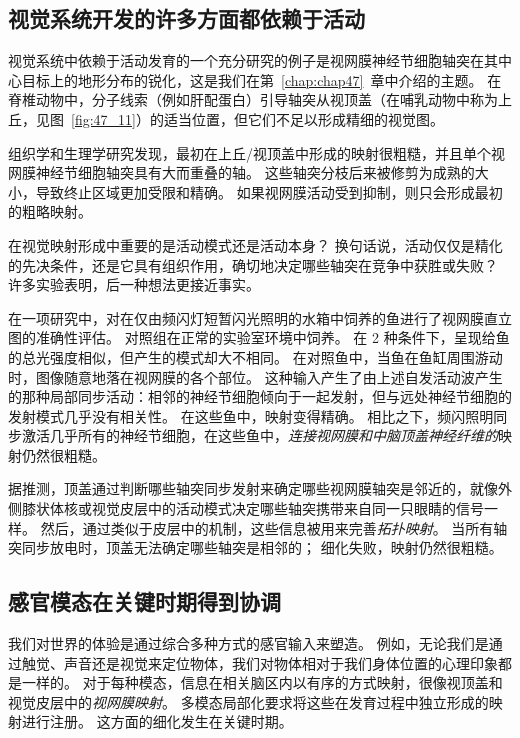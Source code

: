 \subsection{视觉系统开发的许多方面都依赖于活动}

视觉系统中依赖于活动发育的一个充分研究的例子是视网膜神经节细胞轴突在其中心目标上的地形分布的锐化，这是我们在第~\ref{chap:chap47}~章中介绍的主题。
在脊椎动物中，分子线索（例如肝配蛋白）引导轴突从视顶盖（在哺乳动物中称为上丘，见图~\ref{fig:47_11}）的适当位置，但它们不足以形成精细的视觉图。


组织学和生理学研究发现，最初在上丘/视顶盖中形成的映射很粗糙，并且单个视网膜神经节细胞轴突具有大而重叠的轴。
这些轴突分枝后来被修剪为成熟的大小，导致终止区域更加受限和精确。
如果视网膜活动受到抑制，则只会形成最初的粗略映射。


在视觉映射形成中重要的是活动模式还是活动本身？
换句话说，活动仅仅是精化的先决条件，还是它具有组织作用，确切地决定哪些轴突在竞争中获胜或失败？
许多实验表明，后一种想法更接近事实。


在一项研究中，对在仅由频闪灯短暂闪光照明的水箱中饲养的鱼进行了视网膜直立图的准确性评估。
对照组在正常的实验室环境中饲养。
在 2 种条件下，呈现给鱼的总光强度相似，但产生的模式却大不相同。
在对照鱼中，当鱼在鱼缸周围游动时，图像随意地落在视网膜的各个部位。
这种输入产生了由上述自发活动波产生的那种局部同步活动：相邻的神经节细胞倾向于一起发射，但与远处神经节细胞的发射模式几乎没有相关性。
在这些鱼中，映射变得精确。
相比之下，频闪照明同步激活几乎所有的神经节细胞，在这些鱼中，\textit{连接视网膜和中脑顶盖神经纤维的}映射仍然很粗糙。


据推测，顶盖通过判断哪些轴突同步发射来确定哪些视网膜轴突是邻近的，就像外侧膝状体核或视觉皮层中的活动模式决定哪些轴突携带来自同一只眼睛的信号一样。
然后，通过类似于皮层中的机制，这些信息被用来完善\textit{拓扑映射}。
当所有轴突同步放电时，顶盖无法确定哪些轴突是相邻的；
细化失败，映射仍然很粗糙。



\subsection{感官模态在关键时期得到协调}

我们对世界的体验是通过综合多种方式的感官输入来塑造。
例如，无论我们是通过触觉、声音还是视觉来定位物体，我们对物体相对于我们身体位置的心理印象都是一样的。
对于每种模态，信息在相关脑区内以有序的方式映射，很像视顶盖和视觉皮层中的\textit{视网膜映射}。
多模态局部化要求将这些在发育过程中独立形成的映射进行注册。
这方面的细化发生在关键时期。


